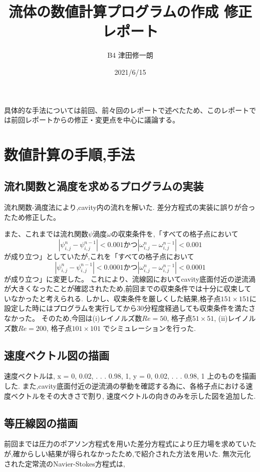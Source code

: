 \documentclass[upLaTeX,a4paper]{jsarticle}
\title{流体の数値計算プログラムの作成 修正レポート}
\author{B4 津田修一朗}
\date{2021/6/15}
\begin{document}
\maketitle

具体的な手法については前回、前々回のレポートで述べたため、このレポートでは前回レポートからの修正・変更点を中心に議論する。

\section{数値計算の手順,手法}
\subsection{流れ関数と渦度を求めるプログラムの実装}
流れ関数-渦度法により,cavity内の流れを解いた.
差分方程式の実装に誤りが合ったため修正した。

また、これまでは流れ関数$\psi$渦度$\omega$の収束条件を,「すべての格子点において
\begin{equation}
  |\psi^n_{i,j}-\psi^{n-1}_{i,j}| < 0.001  かつ  |\omega^n_{i,j}-\omega^{n-1}_{i,j}| < 0.001
\end{equation}
が成り立つ」としていたが,これを「すべての格子点において
\begin{equation}
  |\psi^n_{i,j}-\psi^{n-1}_{i,j}| < 0.0001  かつ  |\omega^n_{i,j}-\omega^{n-1}_{i,j}| < 0.0001
\end{equation}
が成り立つ」に変更した。
これにより、流線図においてcavity底面付近の逆流渦が大きくなったことが確認されたため,前回までの収束条件では十分に収束していなかったと考えられる.
しかし、収束条件を厳しくした結果,格子点$151 × 151$に設定した時にはプログラムを実行してから30分程度経過しても収束条件を満たさなかった。
そのため,今回は(i)レイノルズ数$Re = 50$, 格子点$51\times 51$, (ii)レイノルズ数$Re = 200$, 格子点$101\times 101$
でシミュレーションを行った.

\subsection{速度ベクトル図の描画}
速度ベクトルは, x = 0, 0.02, . . . 0.98, 1, y = 0, 0.02, . . . 0.98, 1 上のものを描画した.
また,cavity底面付近の逆流渦の挙動を確認する為に、各格子点における速度ベクトルをその大きさで割り,
速度ベクトルの向きのみを示した図を追加した.

\subsection{等圧線図の描画}
前回までは圧力のポアソン方程式を用いた差分方程式により圧力場を求めていたが,確からしい結果が得られなかったため,\cite{2}で紹介された方法を用いた.
無次元化された定常流のNavier-Stokes方程式は,
\end{document}
